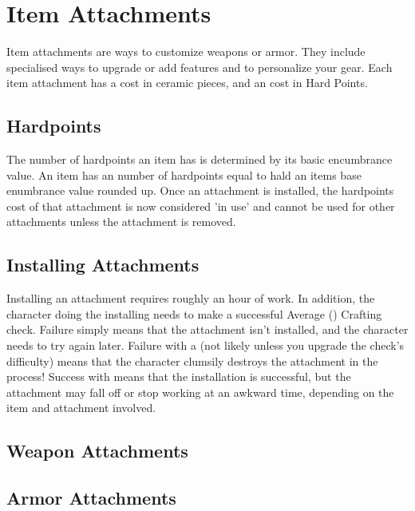 
\hrulefill

\hrulefill


\FloatBarrier
\section{Item Attachments}

Item attachments are ways to customize weapons or armor. They include specialised
ways to upgrade or add features and to personalize your gear. Each item attachment
has a cost in ceramic pieces, and an cost in Hard Points.

\begin{multicols}{2}
\subsection{Hardpoints}
The number of hardpoints an item has is determined by its basic encumbrance value.
An item has an number of hardpoints equal to hald an items base enumbrance value
rounded up. Once an attachment is installed, the hardpoints cost of that attachment
is now considered 'in use' and cannot be used for other attachments unless the
attachment is removed.

\subsection{Installing Attachments}

Installing an attachment requires roughly an hour of work. In addition, the character
doing the installing needs to make a successful  Average (\difficulty\difficulty)
Crafting check. Failure simply means that the attachment isn't installed, and the
character needs to try again later. Failure with a \despair (not likely unless you
upgrade the check's difficulty) means that the character clumsily destroys the
attachment in the process! Success with \despair means that the installation is
successful, but the attachment may fall off or stop working at an awkward time,
depending on the item and attachment involved.

\subsection{Weapon Attachments}








\subsection{Armor Attachments}








\end{multicols}

